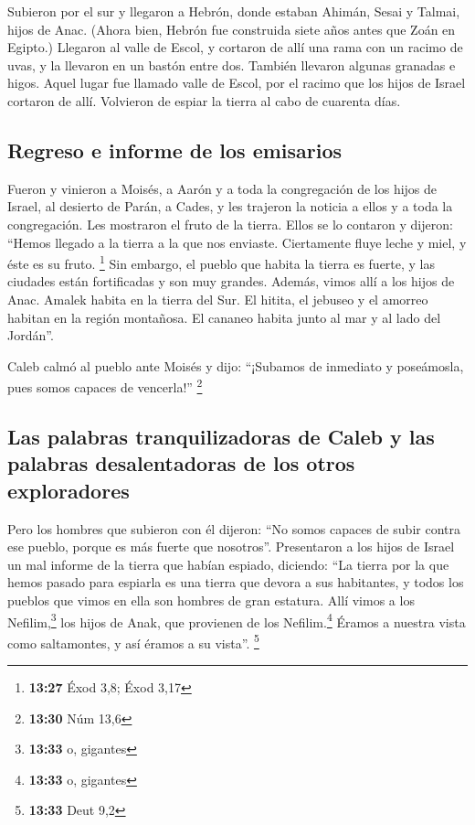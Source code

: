  Subieron por el sur y llegaron a Hebrón, donde estaban
Ahimán, Sesai y Talmai, hijos de Anac. (Ahora bien, Hebrón fue
construida siete años antes que Zoán en Egipto.) 
Llegaron al valle de Escol, y cortaron de allí una rama con un racimo de
uvas, y la llevaron en un bastón entre dos. También llevaron algunas
granadas e higos.  Aquel lugar fue llamado valle de
Escol, por el racimo que los hijos de Israel cortaron de allí.
 Volvieron de espiar la tierra al cabo de cuarenta días.

\hypertarget{regreso-e-informe-de-los-emisarios}{%
\subsection{Regreso e informe de los
emisarios}\label{regreso-e-informe-de-los-emisarios}}

 Fueron y vinieron a Moisés, a Aarón y a toda la
congregación de los hijos de Israel, al desierto de Parán, a Cades, y
les trajeron la noticia a ellos y a toda la congregación. Les mostraron
el fruto de la tierra.  Ellos se lo contaron y dijeron:
``Hemos llegado a la tierra a la que nos enviaste. Ciertamente fluye
leche y miel, y éste es su fruto. \footnote{\textbf{13:27} Éxod 3,8;
  Éxod 3,17}  Sin embargo, el pueblo que habita la tierra
es fuerte, y las ciudades están fortificadas y son muy grandes. Además,
vimos allí a los hijos de Anac.  Amalek habita en la
tierra del Sur. El hitita, el jebuseo y el amorreo habitan en la región
montañosa. El cananeo habita junto al mar y al lado del Jordán''.

 Caleb calmó al pueblo ante Moisés y dijo: ``¡Subamos de
inmediato y poseámosla, pues somos capaces de vencerla!'' \footnote{\textbf{13:30}
  Núm 13,6}

\hypertarget{las-palabras-tranquilizadoras-de-caleb-y-las-palabras-desalentadoras-de-los-otros-exploradores}{%
\subsection{Las palabras tranquilizadoras de Caleb y las palabras
desalentadoras de los otros
exploradores}\label{las-palabras-tranquilizadoras-de-caleb-y-las-palabras-desalentadoras-de-los-otros-exploradores}}

 Pero los hombres que subieron con él dijeron: ``No somos
capaces de subir contra ese pueblo, porque es más fuerte que nosotros''.
 Presentaron a los hijos de Israel un mal informe de la
tierra que habían espiado, diciendo: ``La tierra por la que hemos pasado
para espiarla es una tierra que devora a sus habitantes, y todos los
pueblos que vimos en ella son hombres de gran estatura. 
Allí vimos a los Nefilim,\footnote{\textbf{13:33} o, gigantes} los hijos
de Anak, que provienen de los Nefilim.\footnote{\textbf{13:33} o,
  gigantes} Éramos a nuestra vista como saltamontes, y así éramos a su
vista''. \footnote{\textbf{13:33} Deut 9,2}


